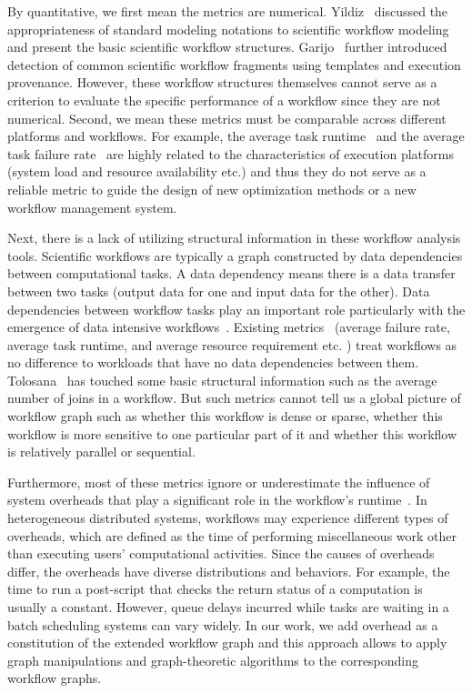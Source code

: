By quantitative, we first mean the metrics are numerical. Yildiz~\cite{Yildiz2009} discussed the appropriateness of standard modeling notations to scientific workflow modeling and present the basic scientific workflow structures. Garijo~\cite{Garijo2013} further introduced detection of common scientific workﬂow fragments using templates and execution provenance. However, these workflow structures themselves cannot serve as a criterion to evaluate the specific performance of a workflow since they are not numerical. Second, we mean these metrics must be comparable across different platforms and workflows. For example, the average task runtime~\cite{Juve2013} and the average task failure rate~\cite{Callaghan2011} are highly related to the characteristics of execution platforms (system load and resource availability etc.) and thus they do not serve as a reliable metric to guide the design of new optimization methods or a new workflow management system. 

Next, there is a lack of utilizing structural information in these workflow analysis tools. Scientific workflows are typically a graph constructed by data dependencies between computational tasks.  A data dependency means there is a data transfer between two tasks (output data for one and input data for the other). Data dependencies between workﬂow tasks play an important role particularly with the emergence of data intensive workflows~\cite{Callaghan2011}. Existing metrics~\cite{Juve2013, Callaghan2011, Bharathi2008}  (average failure rate, average task runtime, and average resource requirement etc. ) treat workflows as no difference to workloads that have no data dependencies between them. Tolosana~\cite{Tolosana2011} has touched some basic structural information such as the average number of joins in a workflow. But such metrics cannot tell us a global picture of workflow graph such as whether this workflow is dense or sparse, whether this workflow is more sensitive to one particular part of it and whether this workflow is relatively parallel or sequential. 

Furthermore, most of these metrics ignore or underestimate the influence of system overheads that play a significant role in the workflow's runtime~\cite{Chen2011, Prodan2008, Ostberg2011}. In heterogeneous distributed systems, workflows may experience different types of overheads, which are defined as the time of performing miscellaneous work other than executing users’ computational activities. Since the causes of overheads differ, the overheads have diverse distributions and behaviors. For example, the time to run a post-script that checks the return status of a computation is usually a constant. However, queue delays incurred while tasks are waiting in a batch scheduling systems can vary widely. In our work, we add overhead as a constitution of the extended workflow graph and this approach allows to apply graph manipulations and graph-theoretic algorithms to the corresponding workflow graphs. 

